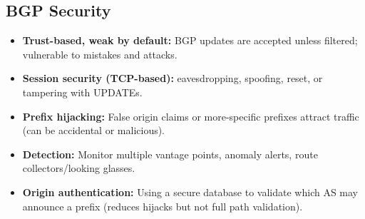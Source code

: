 \subsection{BGP Security}
\begin{itemize}
    \item \textbf{Trust-based, weak by default:} BGP updates are accepted unless filtered; vulnerable to mistakes and attacks.
    \item \textbf{Session security (TCP-based):} eavesdropping, spoofing, reset, or tampering with UPDATEs.
    \item \textbf{Prefix hijacking:} False origin claims or more-specific prefixes attract traffic (can be accidental or malicious).
    \item \textbf{Detection:} Monitor multiple vantage points, anomaly alerts, route collectors/looking glasses.
    \item \textbf{Origin authentication:} Using a secure database to validate which AS may announce a prefix (reduces hijacks but not full path validation).
\end{itemize}

\noindent\hrulefill

